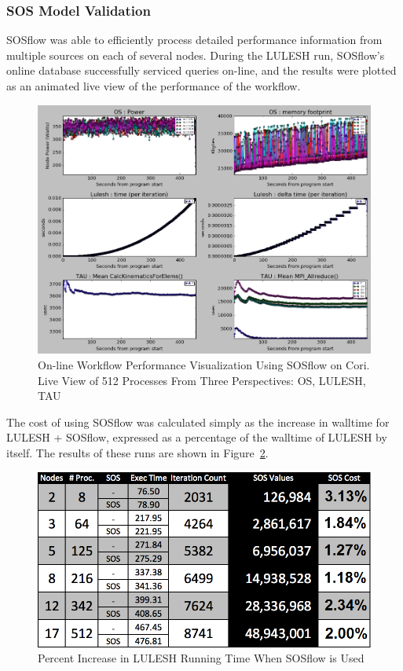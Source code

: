 \subsubsection{SOS Model Validation} %
%
SOSflow was able to efficiently process detailed performance
information from multiple sources on each of several nodes.
%
During the LULESH run, SOSflow's online database successfully serviced
queries on-line, and the results were plotted as an animated live
view of the performance of the workflow.
%
\begin{figure}[h]
\centering
\includegraphics[width=\columnwidth]{images/512_procs.png}
\caption{On-line Workflow Performance Visualization Using SOSflow on
  Cori.  Live View of 512 Processes From Three Perspectives: OS,
  LULESH, TAU}
\label{cori_visualization}
\end{figure}
%
The cost of using SOSflow was calculated simply as the increase in
walltime for LULESH + SOSflow, expressed as a percentage of the walltime
of LULESH by itself.
%
The results of these runs are shown in Figure~\ref{cori_results}.
%
\begin{figure}[h]
\centering
\includegraphics[width=\columnwidth]{images/cori_results.png}
\caption{Percent Increase in LULESH Running Time When SOSflow is Used}
\label{cori_results}
\end{figure}
%
%
